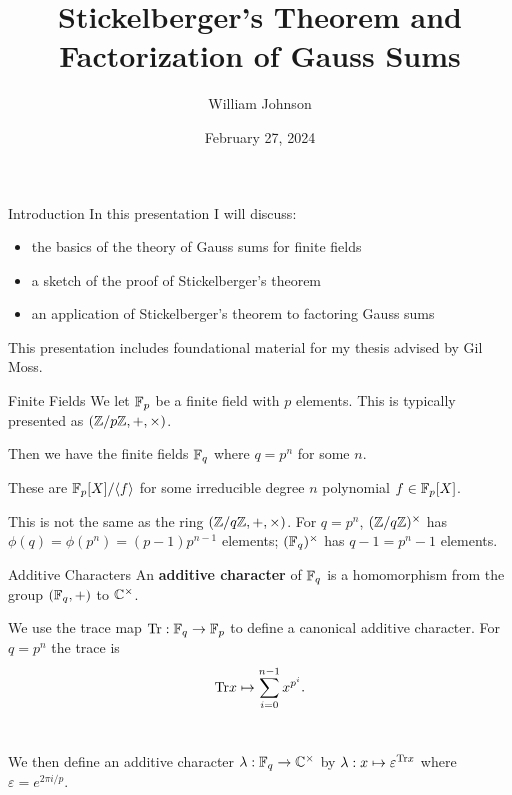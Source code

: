 \documentclass[presentation]{beamer}
\title[] %
{Stickelberger's Theorem and Factorization of Gauss Sums
}
\author[WJ]
{William Johnson
}
\institute[2024] 
{
 University of Maine
}
\date[Thesis 2024]
{February 27, 2024}
\begin{document}
\frame{\titlepage}


\begin{frame}{Introduction}
\bigskip
In this presentation I will discuss:
\begin{itemize}
    \item the basics of the theory of Gauss sums for finite fields
    
    \pause
    
    \item a sketch of the proof of Stickelberger's theorem 
    \pause 
    
    \item an application of Stickelberger's theorem to factoring Gauss sums
    \pause 
\end{itemize}
\bigskip
This presentation includes foundational material for my thesis advised by Gil Moss. 
\end{frame}


\begin{frame}{Finite Fields}
We let $\mathbb{F}_p$ be a finite field with $p$ elements. This is typically presented as $(\mathbb{Z} / p \mathbb{Z}, +, \times)$.\\

\pause
\vspace{0.5cm}

Then we have the finite fields $\mathbb{F}_q$ where $q = p^n$ for some $n$. 

\pause
\vspace{0.5cm}

These are $\mathbb{F}_p[X]/\langle f \rangle$ for some irreducible degree $n$ polynomial $f \in \mathbb{F}_p[X]$. \\

\pause
\vspace{0.5cm}

This is not the same as the ring $(\mathbb{Z}/ q \mathbb{Z}, +, \times)$. For $q = p^n$, $(\mathbb{Z}/q\mathbb{Z})^\times$ has $\phi(q) = \phi(p^n) = (p-1)p^{n-1}$ elements; $(\mathbb{F}_q)^\times$ has $q-1 = p^n - 1$ elements.
\end{frame}

\begin{frame}{Additive Characters}
An \textbf{additive character} of $\mathbb{F}_q$ is a homomorphism from the group $(\mathbb{F}_q, +)$ to $\mathbb{C}^\times$. \\

\pause 
\vspace{0.5cm}

We use the trace map $\textrm{Tr} : \mathbb{F}_q \to \mathbb{F}_p$ to define a canonical additive character. For $q = p^n$ the trace is \[\textrm{Tr} x \mapsto \sum_{i=0}^{n-1} x^{p^i}.\]\\

\pause 
\vspace{0.5cm}

We then define an additive character $\lambda : \mathbb{F}_q \to \mathbb{C}^\times$ by $\lambda : x \mapsto \varepsilon^{\textrm{Tr} x}$ where $\varepsilon = e^{2 \pi i /p}$. 

\end{frame}
\end{document}
